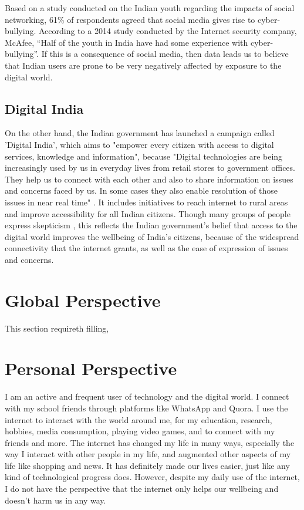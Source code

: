\documentclass[a4paper, 11pt]{article}
\begin{document}
Based on a study conducted on the Indian youth regarding the impacts of social networking, 61\% of respondents agreed that social media gives rise to cyber-bullying. According to a 2014 study conducted by the Internet security company, McAfee, “Half of the youth in India have had some experience with cyber-bullying”. If this is a consequence of social media, then data leads us to believe that Indian users are prone to be very negatively affected by exposure to the digital world.

\subsection{Digital India}
\label{digital-india}
On the other hand, the Indian government has launched a campaign called 'Digital India', which aims to "empower every citizen with access to digital services, knowledge and information", because "Digital technologies are being increasingly used by us in everyday lives from retail stores to government offices. They help us to connect with each other and also to share information on issues and concerns faced by us. In some cases they also enable resolution of those issues in near real time" \cite{digital-india-gov}. It includes initiatives to reach internet to rural areas and improve accessibility for all Indian citizens. Though many groups of people express skepticism \cite{digital-india-thehindu, digital-india-thehindu-2} , this reflects the Indian government's belief that access to the digital world improves the wellbeing of India's citizens, because of the widespread connectivity that the internet grants, as well as the ease of expression of issues and concerns.

\section{Global Perspective}

This section requireth filling,

\section{Personal Perspective}

I am an active and frequent user of technology and the digital world. I connect with my school friends through platforms like WhatsApp and Quora. I use the internet to interact with the world around me, for my education, research, hobbies, media consumption, playing video games, and to connect with my friends and more. The internet has changed my life in many ways, especially the way I interact with other people in my life, and augmented other aspects of my life like shopping and news. It has definitely made our lives easier, just like any kind of technological progress does. However, despite my daily use of the internet, I do not have the perspective that the internet only helps our wellbeing and doesn't harm us in any way.
\end{document}
